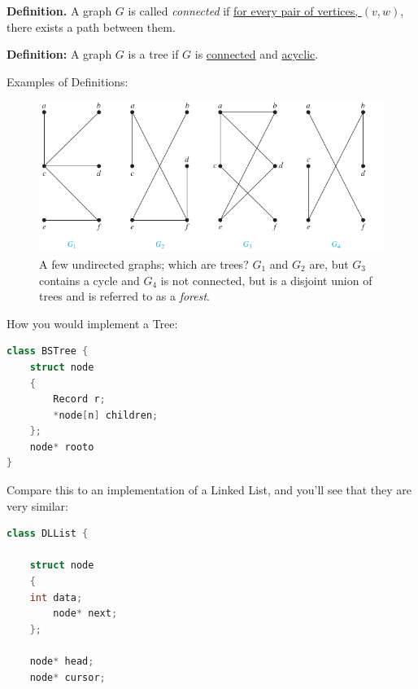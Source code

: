 \documentclass[a4paper,10pt]{report}
\begin{document}
\textbf{Definition.} A graph $G$ is called \textit{connected} if \underline{for every pair of vertices, $(v,w)$}, there exists a path between them.

\textbf{Definition:}  A graph $G$ is a tree if $G$ is \underline{connected} and \underline{acyclic}.

\hrulefill

Examples of Definitions:
\begin{figure}[H]
	\begin{centering}
	\begin{center}
	\includegraphics[width=\linewidth]{./some_trees.png}
	\caption{A few undirected graphs; which are trees? $G_1$ and $G_2$ are, but $G_3$ contains a cycle and $G_4$ is not connected, but is a disjoint union of trees and is referred to as a \textit{forest}.}
	\label{fig:some_trees}
	\end{center}
	\par\end{centering}
\end{figure}

\newpage
How you would implement a Tree:
\begin{lstlisting}[language=C++]
class BSTree {
    struct node
    {
        Record r;
        *node[n] children;
    };
	node* rooto
}
\end{lstlisting}

Compare this to an implementation of a Linked List, and you'll see that they are very similar:
\begin{lstlisting}[language=C++]
class DLList {

    struct node
    {
	int data;
        node* next;
    };

    node* head;
    node* cursor;
\end{lstlisting}
\end{document}

